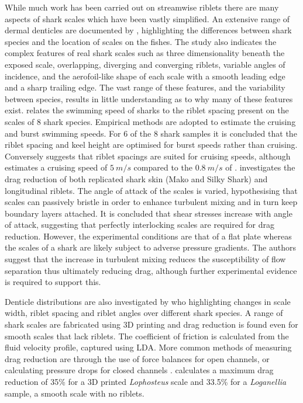\documentclass[12pt,oneside,a4paper]{article}
\begin{document}
While much work has been carried out on streamwise riblets there are many aspects of shark scales which have been vastly simplified. An extensive range of dermal denticles are documented by \cite{reif1985}, highlighting the differences between shark species and the location of scales on the fishes. The study also indicates the complex features of real shark scales such as three dimensionality beneath the exposed scale, overlapping, diverging and converging riblets, variable angles of incidence, and the aerofoil-like shape of each scale with a smooth leading edge and a sharp trailing edge. The vast range of these features, and the variability between species, results in little understanding as to why many of these features exist. \cite{raschi1986} relates the swimming speed of sharks to the riblet spacing present on the scales of 8 shark species. Empirical methods are adopted to estimate the cruising and burst swimming speeds. For 6 of the 8 shark samples it is concluded that the riblet spacing and keel height are optimised for burst speeds rather than cruising. Conversely \cite{bechert1985} suggests that riblet spacings are suited for cruising speeds, although estimates a cruising speed of $5\ m/s$ compared to the $0.8\ m/s$ of \cite{raschi1986}.  \cite{bechert1985} investigates the drag reduction of both replicated shark skin (Mako and Silky Shark) and longitudinal riblets. The angle of attack of the scales is varied, hypothesising that scales can passively bristle in order to enhance turbulent mixing and in turn keep boundary layers attached. It is concluded that shear stresses increase with angle of attack, suggesting that perfectly interlocking scales are required for drag reduction. However, the experimental conditions are that of a flat plate whereas the scales of a shark are likely subject to adverse pressure gradients. The authors suggest that the increase in turbulent mixing reduces the susceptibility of flow separation thus ultimately reducing drag, although further experimental evidence is required to support this. 

Denticle distributions are also investigated by \cite{fletcher2014phd} who highlighting changes in scale width, riblet spacing and riblet angles over different shark species. A range of shark scales are fabricated using 3D printing and drag reduction is found even for smooth scales that lack riblets. The coefficient of friction is calculated from the fluid velocity profile, captured using LDA. More common methods of measuring drag reduction are through the use of force balances for open channels, or calculating pressure drops for closed channels \citep{bixler2013review}. \cite{fletcher2014phd} calculates a maximum drag reduction of 35\% for a 3D printed \textit{Lophosteus} scale and 33.5\% for a \textit{Loganellia} sample, a smooth scale with no riblets.
\end{document}
